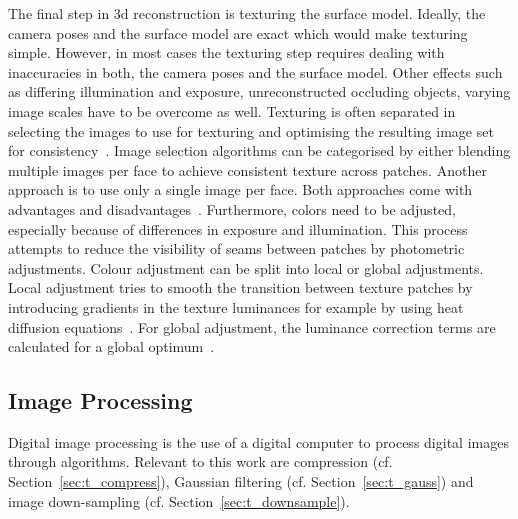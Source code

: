 The final step in \gls{3d} reconstruction is texturing the surface model. Ideally, the camera poses and the surface model are exact which would make texturing simple. However, in most cases the texturing step requires dealing with inaccuracies in both, the camera poses and the surface model. Other effects such as differing illumination and exposure, unreconstructed occluding objects, varying image scales have to be overcome as well. Texturing is often separated in selecting the images to use for texturing and optimising the resulting image set for consistency~\cite{Waechter2014LetReconstructions}.
Image selection algorithms can be categorised by either blending multiple images per face to achieve consistent texture across patches. Another approach is to use only a single image per face. Both approaches come with advantages and disadvantages~\cite{Waechter2014LetReconstructions}.
Furthermore, colors need to be adjusted, especially because of differences in exposure and illumination. This process attempts to reduce the visibility of seams between patches by photometric adjustments. Colour adjustment can be split into local or global adjustments. Local adjustment tries to smooth the transition between texture patches by introducing gradients in the texture luminances for example by using heat diffusion equations~\cite{Velho2007ProjectivePhotography}. For global adjustment, the luminance correction terms are calculated for a global optimum~\cite{Lempitsky2007SeamlessMaps}.


\subsection{Image Processing}
Digital image processing is the use of a digital computer to process digital images through algorithms. Relevant to this work are compression (cf. Section~\ref{sec:t_compress}), Gaussian filtering  (cf. Section~\ref{sec:t_gauss}) and image down-sampling  (cf. Section~\ref{sec:t_downsample}).

